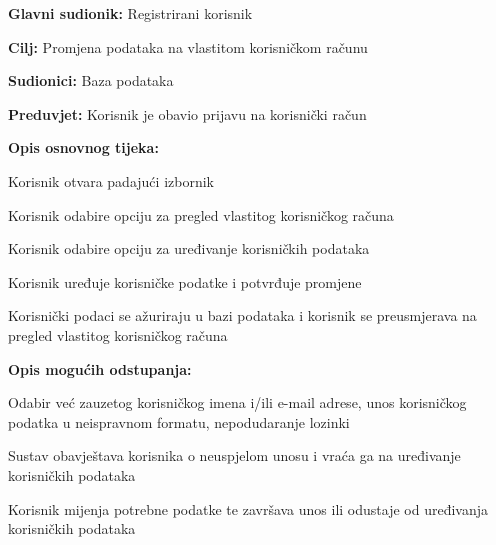 \noindent {}
\begin{packed_item}

	\item \textbf{Glavni sudionik: }Registrirani korisnik
	\item  \textbf{Cilj:} Promjena podataka na vlastitom korisničkom računu 
	\item  \textbf{Sudionici:} Baza podataka
	\item  \textbf{Preduvjet:} Korisnik je obavio prijavu na korisnički račun
	\item  \textbf{Opis osnovnog tijeka:}

	\item[] \begin{packed_enum}

		\item Korisnik otvara padajući izbornik
		\item Korisnik odabire opciju za pregled vlastitog korisničkog računa
		\item Korisnik odabire opciju za uređivanje korisničkih podataka
		\item Korisnik uređuje korisničke podatke i potvrđuje promjene
		\item Korisnički podaci se ažuriraju u bazi podataka i korisnik se preusmjerava na pregled vlastitog korisničkog računa
	\end{packed_enum}

	\item  \textbf{Opis mogućih odstupanja:}

	\item[] \begin{packed_item}

		\item[4.a] Odabir već zauzetog korisničkog imena i/ili e-mail adrese, unos korisničkog podatka u neispravnom formatu, nepodudaranje lozinki
		\item[] \begin{packed_enum}

			\item Sustav obavještava korisnika o neuspjelom unosu i vraća ga na uređivanje korisničkih podataka
			\item Korisnik mijenja potrebne podatke te završava unos ili odustaje od uređivanja korisničkih podataka

		\end{packed_enum}
	\end{packed_item}
\end{packed_item}


